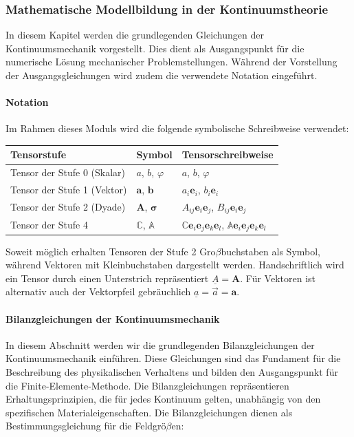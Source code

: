 \subsubsection{Mathematische Modellbildung in der Kontinuumstheorie}

In diesem Kapitel werden die grundlegenden Gleichungen der Kontinuumsmechanik vorgestellt. Dies dient als Ausgangspunkt für die numerische Lösung mechanischer Problemstellungen. Während der Vorstellung der Ausgangsgleichungen wird zudem die verwendete Notation eingeführt.

\paragraph{Notation}

Im Rahmen dieses Moduls wird die folgende symbolische Schreibweise verwendet:

\bigskip\noindent
\begin{tabular}{p{}p{}p{}}
\toprule
Tensorstufe & Symbol & Tensorschreibweise \\
\hline
Tensor der Stufe 0 (Skalar) & $a$, $b$, $\varphi$ & $a$, $b$, $\varphi$ \\
Tensor der Stufe 1 (Vektor) & $\bm{a}$, $\bm{b}$ & $a_i\bm{e}_i$, $b_i\bm{e}_i$ \\
Tensor der Stufe 2 (Dyade) & $\bm{A}$, $\bm{\sigma}$ & $A_{ij}\bm{e}_i\bm{e}_j$, $B_{ij}\bm{e}_i\bm{e}_j$ \\
Tensor der Stufe 4 & $\mathbb{C}$, $\mathbb{A}$ & $\mathbb{C}\bm{e}_i\bm{e}_j\bm{e}_k\bm{e}_l$, $\mathbb{A}\bm{e}_i\bm{e}_j\bm{e}_k\bm{e}_l$ \\
\bottomrule
\end{tabular}

Soweit möglich erhalten Tensoren der Stufe 2 Gro$\beta$buchstaben als Symbol, während Vektoren mit Kleinbuchstaben dargestellt werden. Handschriftlich wird ein Tensor durch einen Unterstrich repräsentiert $\underline{A}=\bm{A}$. Für Vektoren ist alternativ auch der Vektorpfeil gebräuchlich $\underline{a} = \vec{a} = \bm{a}$.


\paragraph{Bilanzgleichungen der Kontinuumsmechanik}

In diesem Abschnitt werden wir die grundlegenden Bilanzgleichungen der Kontinuumsmechanik einführen. Diese Gleichungen sind das Fundament für die Beschreibung des physikalischen Verhaltens und bilden den Ausgangspunkt für die Finite-Elemente-Methode. Die Bilanzgleichungen repräsentieren Erhaltungsprinzipien, die für jedes Kontinuum gelten, unabhängig von den spezifischen Materialeigenschaften. Die Bilanzgleichungen dienen als Bestimmungsgleichung für die Feldgrö$\beta$en:

